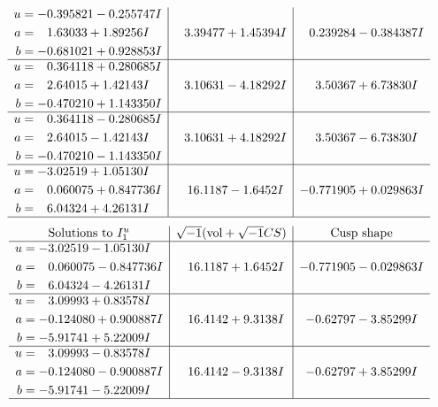 \documentclass[1p]{elsarticle_modified}
\theoremstyle{definition}
\newcommand{\I}{\sqrt{-1}}
\begin{document}
$$\begin{array}{c|c|c}
\begin{aligned}
u &= -0.395821 - 0.255747 I \\
a &= \phantom{-}1.63033 + 1.89256 I \\
b &= -0.681021 + 0.928853 I\end{aligned}
 & \phantom{-}3.39477 + 1.45394 I & \phantom{-}0.239284 - 0.384387 I \\ \hline\begin{aligned}
u &= \phantom{-}0.364118 + 0.280685 I \\
a &= \phantom{-}2.64015 + 1.42143 I \\
b &= -0.470210 + 1.143350 I\end{aligned}
 & \phantom{-}3.10631 - 4.18292 I & \phantom{-}3.50367 + 6.73830 I \\ \hline\begin{aligned}
u &= \phantom{-}0.364118 - 0.280685 I \\
a &= \phantom{-}2.64015 - 1.42143 I \\
b &= -0.470210 - 1.143350 I\end{aligned}
 & \phantom{-}3.10631 + 4.18292 I & \phantom{-}3.50367 - 6.73830 I \\ \hline\begin{aligned}
u &= -3.02519 + 1.05130 I \\
a &= \phantom{-}0.060075 + 0.847736 I \\
b &= \phantom{-}6.04324 + 4.26131 I\end{aligned}
 & \phantom{-}16.1187 - 1.6452 I & -0.771905 + 0.029863 I\\
 \hline 
 \end{array}$$\newpage$$\begin{array}{c|c|c}  
\text{Solutions to }I^u_{1}& \I (\text{vol} + \sqrt{-1}CS) & \text{Cusp shape}\\
 \hline 
\begin{aligned}
u &= -3.02519 - 1.05130 I \\
a &= \phantom{-}0.060075 - 0.847736 I \\
b &= \phantom{-}6.04324 - 4.26131 I\end{aligned}
 & \phantom{-}16.1187 + 1.6452 I & -0.771905 - 0.029863 I \\ \hline\begin{aligned}
u &= \phantom{-}3.09993 + 0.83578 I \\
a &= -0.124080 + 0.900887 I \\
b &= -5.91741 + 5.22009 I\end{aligned}
 & \phantom{-}16.4142 + 9.3138 I & -0.62797 - 3.85299 I \\ \hline\begin{aligned}
u &= \phantom{-}3.09993 - 0.83578 I \\
a &= -0.124080 - 0.900887 I \\
b &= -5.91741 - 5.22009 I\end{aligned}
 & \phantom{-}16.4142 - 9.3138 I & -0.62797 + 3.85299 I\\
 \hline 
 \end{array}$$\newpage\newpage\renewcommand{\arraystretch}{1}
\end{document}
